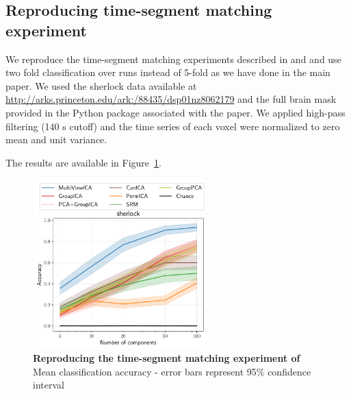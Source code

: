 \subsection{Reproducing time-segment matching experiment}
\label{appendix_reproduce}
We reproduce the time-segment matching experiments described in \cite{chen2016convolutional} and \cite{zhang2016searchlight} and use two fold classification over runs instead of 5-fold as we have done in the main paper. We used the sherlock data available at \url{http://arks.princeton.edu/ark:/88435/dsp01nz8062179} and the full brain mask provided in the Python package associated with the paper. We applied high-pass filtering (140 s cutoff) and the time series of each voxel were normalized to zero mean and unit variance.

The results are available in Figure~\ref{fig:supp_timesegment}.

\begin{figure}
  \centering
  \includegraphics[width=0.6\textwidth]{figures/mvica/timesegment_matching_cae.pdf}
  \caption{\textbf{Reproducing the time-segment matching experiment of \cite{chen2016convolutional}~\cite{zhang2016searchlight}} Mean classification accuracy - error bars represent 95\% confidence interval}
  \label{fig:supp_timesegment}
\end{figure}

